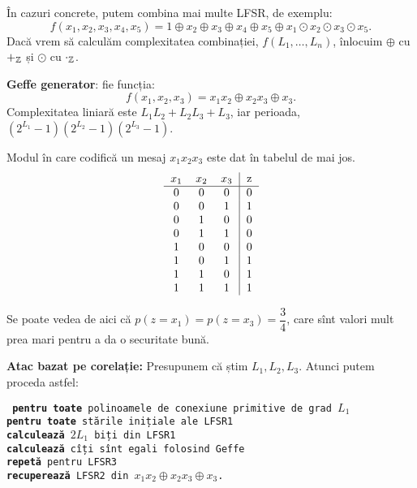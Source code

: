 În cazuri concrete, putem combina mai multe LFSR, de exemplu:
\[
  f(x_1, x_2, x_3, x_4, x_5) = 1 \oplus x_2 \oplus x_3 \oplus x_4 \oplus x_5 %
  \oplus x_1 \odot x_2 \odot x_3 \odot x_5.
\]
Dacă vrem să calculăm complexitatea combinației, $ f(L_1, \dots, L_n) $,
înlocuim $ \oplus $ cu $ +_{\mathbb{Z}} $ și $ \odot $ cu $ \cdot_{\mathbb{Z}} $.

\begin{example} 
  \textbf{Geffe generator}: fie funcția:
  \[
    f(x_1, x_2, x_3) = x_1x_2 \oplus x_2 x_3 \oplus x_3.
  \]
  Complexitatea liniară este $ L_1 L_2 + L_2 L_3 + L_3 $, iar
  perioada, $ (2^{L_1} - 1)(2^{L_2} - 1)(2^{L_3} - 1) $.

  Modul în care codifică un mesaj $ x_1x_2x_3 $ este dat în tabelul de mai jos.
  \[
    \begin{tabular}{ccc|c}
      $ x_1 $ & $ x_2 $ & $ x_3 $ & z \\
      \hline
      0 & 0 & 0 & 0 \\
      0 & 0 & 1 & 1 \\
      0 & 1 & 0 & 0 \\
      0 & 1 & 1 & 0 \\
      1 & 0 & 0 & 0 \\
      1 & 0 & 1 & 1 \\
      1 & 1 & 0 & 1 \\
      1 & 1 & 1 & 1
    \end{tabular}
  \]

  Se poate vedea de aici că $ p(z = x_1) = p(z = x_3) = \dfrac{3}{4} $,
  care sînt valori mult prea mari pentru a da o securitate bună.
\end{example}

\begin{example} 
  \textbf{Atac bazat pe corelație:} Presupunem că știm $ L_1, L_2, L_3 $.
  Atunci putem proceda astfel:
  
  \texttt{
    \quad\textbf{pentru toate} polinoamele de conexiune primitive de grad $ L_1 $ \\
    \indent \indent \indent \textbf{pentru toate} stările inițiale ale LFSR1 \\
    \indent\indent\indent\indent \indent \textbf{calculează} $ 2L_1 $ biți din LFSR1 \\
    \indent\indent\indent\indent \indent \textbf{calculează} cîți sînt egali folosind Geffe \\
    \indent\indent \textbf{repetă} pentru LFSR3 \\
    \indent\indent\textbf{recuperează} LFSR2 din $ x_1 x_2 \oplus x_2 x_3 \oplus x_3 $.
  }
\end{example}

